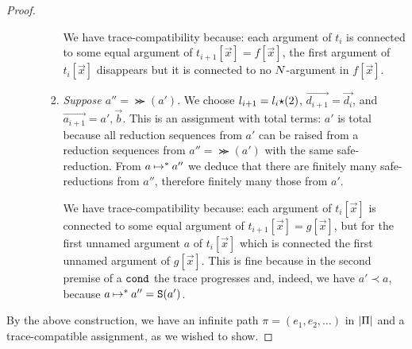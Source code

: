 \begin{proof}
\begin{enumerate}
\begin{enumerate}
\begin{enumerate}
  We have trace-compatibility because: 
  each argument of $t_i$ is connected to some equal argument of
  $t_{i+1}[\vec{x}]=f[\vec{x}]$,
  the first argument of $t_i[\vec{x}]$ disappears   
  but it is connected to no ${N}$-argument in $f[\vec{x}]$.

 \item
  \emph{Suppose $a'' = \Succ(a')$}. 
  We choose $l_{i+1} = l_i {\star} (2)$, $\vec{d_{i+1}} = \vec{d_i}$, and
  $\vec{a_{i+1}} = a',\vec{b}$. This is an assignment with total terms: $a'$ is total because
  all reduction sequences from $a'$ can be raised from a reduction sequences from 
  $a'' = \Succ(a')$ with the same safe-reduction. From $a \mathbin{\mapsto}^{*} a''$ we deduce that
  there are finitely many safe-reductions from $a''$, therefore finitely many those from $a'$.
 
  We have trace-compatibility because: each argument of $t_i[\vec{x}]$ is connected 
  to some equal argument of $t_{i+1}[\vec{x}]=g[\vec{x}]$,
  but for the first unnamed argument $a$ of $t_i[\vec{x}]$ 
  which is connected the first unnamed argument of $g[\vec{x}]$.
  This is fine because in the second premise of a ${\tt cond}$ 
  the trace progresses and, indeed, we have $a' \prec a$, 
  because $a \mathbin{\mapsto}^{*}  a'' = {\tt S}(a')$.
  \end{enumerate}
 \end{enumerate}
\end{enumerate}

By the above construction, we have an infinite path $\pi = (e_1,e_2,\ldots)$ in ${|\Pi|}$
and a trace-compatible assignment, as we wished to show.

\end{proof}



%


